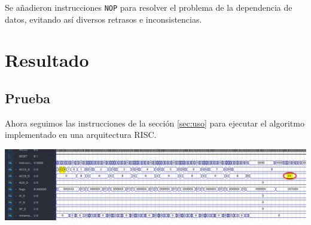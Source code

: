 \documentclass{IEEEtran}
\begin{document}
Se añadieron instrucciones \texttt{NOP} para resolver el problema de la dependencia de datos, evitando así diversos retrasos e inconsistencias.

\section{Resultado}
\label{sec:org6d37d33}
\subsection{Prueba}
\label{sec:orgb9e3462}
Ahora seguimos las instrucciones de la sección \ref{sec:uso} para ejecutar el algoritmo implementado en una arquitectura RISC.
\begin{center}
\includegraphics[width=.9\linewidth]{../img/7.png}
\end{center}
\end{document}
